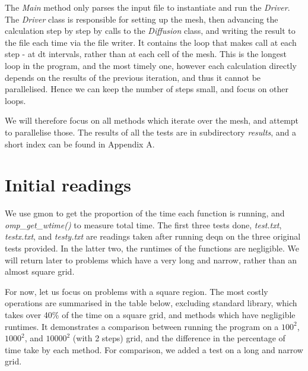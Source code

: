 \documentclass[11pt,journal]{IEEEtran}
\begin{document}
	The \emph{Main} method only parses the input file to instantiate and run the \emph{Driver}. The \emph{Driver} class is responsible for setting up the mesh, then advancing the calculation step by step by calls to the \emph{Diffusion} class, and writing the result to the file each time via the file writer. It contains the loop that makes call at each step - at dt intervals, rather than at each cell of the mesh. This is the longest loop in the program, and the most timely one, however each calculation directly depends on the results of the previous iteration, and thus it cannot be parallelised. Hence we can keep the number of steps small, and focus on other loops.
	
	We will therefore focus on all methods which iterate over the mesh, and attempt to parallelise those. The results of all the tests are in subdirectory \emph{results}, and a short index can be found in Appendix A.
	
	\section{Initial readings}
	We use gmon to get the proportion of the time each function is running, and \emph{omp\_get\_wtime()} to measure total time. The first three tests done, \emph{test.txt}, \emph{testx.txt}, and \emph{testy.txt} are readings taken after running deqn on the three original tests provided. In the latter two, the runtimes of the functions are negligible. We will return later to problems which have a very long and narrow, rather than an almost square grid. 
	
	For now, let us focus on problems with a square region. The most costly operations are summarised in the table below, excluding standard library, which takes over 40\% of the time on a square grid, and methods which have negligible runtimes. It demonstrates a comparison between running the program on a $100^2$, $1000^2$, and $10000^2$ (with 2 steps) grid, and the difference in the percentage of time take by each method. For comparison, we added a test on a long and narrow grid.
	
\end{document}
